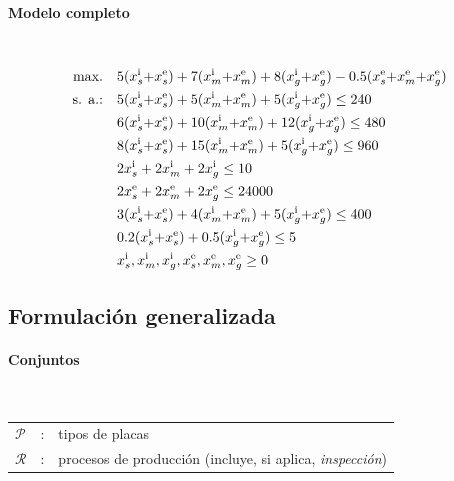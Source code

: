 \paragraph{Modelo completo}\mbox{}\\
\begin{align}
\mbox{max.}\quad
& 5(x_s^{\mathrm{i}}{+}x_s^{\mathrm{e}}) + 7(x_m^{\mathrm{i}}{+}x_m^{\mathrm{e}}) + 8(x_g^{\mathrm{i}}{+}x_g^{\mathrm{e}})
 - 0.5(x_s^{\mathrm{e}}{+}x_m^{\mathrm{e}}{+}x_g^{\mathrm{e}}) \notag\\
\mbox{s. a.:}\quad
& 5(x_s^{\mathrm{i}}{+}x_s^{\mathrm{e}}) + 5(x_m^{\mathrm{i}}{+}x_m^{\mathrm{e}}) + 5(x_g^{\mathrm{i}}{+}x_g^{\mathrm{e}}) \le 240 \notag\\
& 6(x_s^{\mathrm{i}}{+}x_s^{\mathrm{e}}) + 10(x_m^{\mathrm{i}}{+}x_m^{\mathrm{e}}) + 12(x_g^{\mathrm{i}}{+}x_g^{\mathrm{e}}) \le 480 \notag\\
& 8(x_s^{\mathrm{i}}{+}x_s^{\mathrm{e}}) + 15(x_m^{\mathrm{i}}{+}x_m^{\mathrm{e}}) + 5(x_g^{\mathrm{i}}{+}x_g^{\mathrm{e}}) \le 960 \notag\\
& 2x_s^{\mathrm{i}} + 2x_m^{\mathrm{i}} + 2x_g^{\mathrm{i}} \le 10 \notag\\
& 2x_s^{\mathrm{e}} + 2x_m^{\mathrm{e}} + 2x_g^{\mathrm{e}} \le 24000 \notag\\
& 3(x_s^{\mathrm{i}}{+}x_s^{\mathrm{e}}) + 4(x_m^{\mathrm{i}}{+}x_m^{\mathrm{e}}) + 5(x_g^{\mathrm{i}}{+}x_g^{\mathrm{e}}) \le 400 \notag\\
& 0.2(x_s^{\mathrm{i}}{+}x_s^{\mathrm{e}}) + 0.5(x_g^{\mathrm{i}}{+}x_g^{\mathrm{e}}) \le 5 \notag\\
& x_s^{\mathrm{i}},x_m^{\mathrm{i}},x_g^{\mathrm{i}},x_s^{\mathrm{e}},x_m^{\mathrm{e}},x_g^{\mathrm{e}} \ge 0 \notag
\end{align}


\subsection{Formulación generalizada}

\paragraph{Conjuntos}\mbox{}\\
\begin{tabular}{l c l}
    $\mathcal{P}$ & : & tipos de placas \\
    $\mathcal{R}$ & : & procesos de producción (incluye, si aplica, \emph{inspección}) \\
\end{tabular}
\\[0.25cm]

